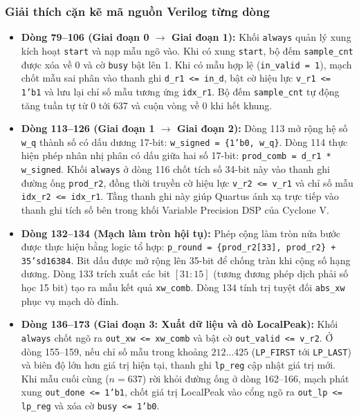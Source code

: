 \subsubsection*{Giải thích cặn kẽ mã nguồn Verilog từng dòng}
\begin{itemize}[leftmargin=1.5em, itemsep=3pt]
    \item \textbf{Dòng 79--106 (Giai đoạn 0 $\to$ Giai đoạn 1):} Khối \texttt{always} quản lý xung kích hoạt \texttt{start} và nạp mẫu ngõ vào. Khi có xung \texttt{start}, bộ đếm \texttt{sample\_cnt} được xóa về 0 và cờ \texttt{busy} bật lên 1. Khi có mẫu hợp lệ (\texttt{in\_valid = 1}), mạch chốt mẫu sai phân vào thanh ghi \texttt{d\_r1 <= in\_d}, bật cờ hiệu lực \texttt{v\_r1 <= 1'b1} và lưu lại chỉ số mẫu tương ứng \texttt{idx\_r1}. Bộ đếm \texttt{sample\_cnt} tự động tăng tuần tự từ 0 tới 637 và cuộn vòng về 0 khi hết khung.
    \item \textbf{Dòng 113--126 (Giai đoạn 1 $\to$ Giai đoạn 2):} Dòng 113 mở rộng hệ số \texttt{w\_q} thành số có dấu dương 17-bit: \texttt{w\_signed = \{1'b0, w\_q\}}. Dòng 114 thực hiện phép nhân nhị phân có dấu giữa hai số 17-bit: \texttt{prod\_comb = d\_r1 * w\_signed}. Khối \texttt{always} ở dòng 116 chốt tích số 34-bit này vào thanh ghi đường ống \texttt{prod\_r2}, đồng thời truyền cờ hiệu lực \texttt{v\_r2 <= v\_r1} và chỉ số mẫu \texttt{idx\_r2 <= idx\_r1}. Tầng thanh ghi này giúp Quartus ánh xạ trực tiếp vào thanh ghi tích số bên trong khối Variable Precision DSP của Cyclone V.
    \item \textbf{Dòng 132--134 (Mạch làm tròn hội tụ):} Phép cộng làm tròn nửa bước được thực hiện bằng logic tổ hợp: \texttt{p\_round = \{prod\_r2[33], prod\_r2\} + 35'sd16384}. Bit dấu được mở rộng lên 35-bit để chống tràn khi cộng số hạng dương. Dòng 133 trích xuất các bit $[31:15]$ (tương đương phép dịch phải số học 15 bit) tạo ra mẫu kết quả \texttt{xw\_comb}. Dòng 134 tính trị tuyệt đối \texttt{abs\_xw} phục vụ mạch dò đỉnh.
    \item \textbf{Dòng 136--173 (Giai đoạn 3: Xuất dữ liệu và dò LocalPeak):} Khối \texttt{always} chốt ngõ ra \texttt{out\_xw <= xw\_comb} và bật cờ \texttt{out\_valid <= v\_r2}. Ở dòng 155--159, nếu chỉ số mẫu trong khoảng $212 \dots 425$ (\texttt{LP\_FIRST} tới \texttt{LP\_LAST}) và biên độ lớn hơn giá trị hiện tại, thanh ghi \texttt{lp\_reg} cập nhật giá trị mới. Khi mẫu cuối cùng ($n = 637$) rời khỏi đường ống ở dòng 162--166, mạch phát xung \texttt{out\_done <= 1'b1}, chốt giá trị LocalPeak vào cổng ngõ ra \texttt{out\_lp <= lp\_reg} và xóa cờ \texttt{busy <= 1'b0}.
\end{itemize}

